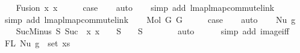 \begin{isabellebody}
\isanewline
\ \ \isamarkupfalse%
\ {\isacharparenleft}{\kern0pt}Fusion\ x{}\ x{}{\isacharparenright}{\kern0pt}\isanewline
\ \ \isamarkupfalse%
\ \isamarkupfalse%
\ {\isacharquery}{\kern0pt}case\isanewline
\ \ \isamarkupfalse%
\ auto\isanewline
\ \ \isamarkupfalse%
\ {\isacharparenleft}{\kern0pt}simp\ add{\isacharcolon}{\kern0pt}\ lmap{\isacharunderscore}{\kern0pt}lmap{\isacharunderscore}{\kern0pt}commute{\isacharunderscore}{\kern0pt}link{\isacharparenright}{\kern0pt}\isanewline
\ \ \isamarkupfalse%
\ {\isacharparenleft}{\kern0pt}simp\ add{\isacharcolon}{\kern0pt}\ lmap{\isacharunderscore}{\kern0pt}lmap{\isacharunderscore}{\kern0pt}commute{\isacharunderscore}{\kern0pt}link{\isacharparenright}{\kern0pt}\isanewline
{}\isamarkupfalse%
\isanewline
\ \ \isamarkupfalse%
\ {\isacharparenleft}{\kern0pt}Mol\ G{}\ G{}{\isacharparenright}{\kern0pt}\isanewline
\ \ \isamarkupfalse%
\ \isamarkupfalse%
\ {\isacharquery}{\kern0pt}case\isanewline
\ \ \isamarkupfalse%
\ auto\isanewline
{}\isamarkupfalse%
\isanewline
\ \ \isamarkupfalse%
\ {\isacharparenleft}{\kern0pt}Nu\ g{\isacharparenright}{\kern0pt}\isanewline
\isanewline
\ \ \isamarkupfalse%
\ SucMinus{\isacharcolon}{\kern0pt}\ {\isachardoublequoteopen}{\isasymforall}S{\isachardot}{\kern0pt}\ Suc\ {\isacharbackquote}{\kern0pt}\ {\isacharparenleft}{\kern0pt}{\isasymlambda}x{\isachardot}{\kern0pt}\ x\ {\isacharminus}{\kern0pt}\ {}{\isacharparenright}{\kern0pt}\ {\isacharbackquote}{\kern0pt}\ {\isacharparenleft}{\kern0pt}S\ {\isacharminus}{\kern0pt}\ {\isacharbraceleft}{\kern0pt}{}{\isacharbraceright}{\kern0pt}{\isacharparenright}{\kern0pt}\ {\isacharequal}{\kern0pt}\ S\ {\isacharminus}{\kern0pt}\ {\isacharbraceleft}{\kern0pt}{}{\isacharbraceright}{\kern0pt}{\isachardoublequoteclose}\isanewline
\ \ \ \ \isamarkupfalse%
\ auto\isanewline
\ \ \ \ \isamarkupfalse%
\ {\isacharparenleft}{\kern0pt}simp\ add{\isacharcolon}{\kern0pt}\ image{\isacharunderscore}{\kern0pt}iff{\isacharparenright}{\kern0pt}\isanewline
\isanewline
\ \ \isamarkupfalse%
\ {\isachardoublequoteopen}FL\ {\isacharparenleft}{\kern0pt}Nu\ g{\isacharparenright}{\kern0pt}\ {\isasymsubseteq}\ set\ xs{\isachardoublequoteclose}\isanewline
\ \ \ \ \isamarkupfalse%

\end{isabellebody}
